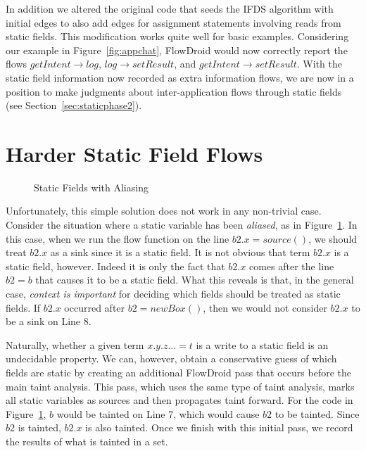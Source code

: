 In addition we altered the original code that seeds the IFDS algorithm with initial edges to also add edges for assignment statements involving reads from static fields. This modification works quite well for basic examples. Considering our example in Figure~\ref{fig:appchat}, FlowDroid would now correctly report the flows $getIntent\rightarrow log$, $log\rightarrow setResult$, and $getIntent\rightarrow setResult$. With the static field information now recorded as extra information flows, we are now in a position to make judgments about inter-application flows through static fields (see Section~\ref{sec:staticphase2}).

\section{Harder Static Field Flows}

\begin{figure}
\begin{framed}
\begin{center}
\begin{minipage}{0.85\textwidth}

\end{minipage}
\end{center}
\caption{Static Fields with Aliasing}
\label{fig:aliased}
\end{framed}
\end{figure}

Unfortunately, this simple solution does not work in any non-trivial case. Consider the situation where a static variable has been \emph{aliased}, as in Figure~\ref{fig:aliased}. In this case, when we run the flow function on the line $\mathit{b2}.x = source()$, we should treat $\mathit{b2}.x$ as a sink since it is a static field. It is not obvious that term $\mathit{b2}.x$ is a static field, however. Indeed it is only the fact that $\mathit{b2}.x$ comes after the line $\mathit{b2} = b$ that causes it to be a static field. What this reveals is that, in the general case, \emph{context is important} for deciding which fields should be treated as static fields. If $\mathit{b2}.x$ occurred after $\mathit{b2} = new Box()$, then we would not consider $\mathit{b2}.x$ to be a sink on Line 8.

Naturally, whether a given term $x.y.z... = t$ is a write to a static field is an undecidable property. We can, however, obtain a conservative guess of which fields are static by creating an additional FlowDroid pass that occurs before the main taint analysis. This pass, which uses the same type of taint analysis, marks all static variables as sources and then propagates taint forward. For the code in Figure~\ref{fig:aliased}, $b$ would be tainted on Line 7, which would cause $\mathit{b2}$ to be tainted. Since $\mathit{b2}$ is tainted, $\mathit{b2}.x$ is also tainted. Once we finish with this initial pass, we record the results of what is tainted in a set.

